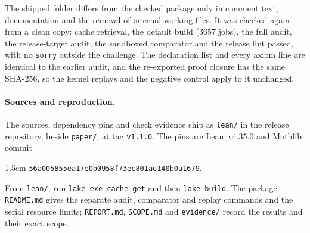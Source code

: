 The shipped folder differs from the checked package only in comment
text, documentation and the removal of internal working files. It was
checked again from a clean copy: cache retrieval, the default build
(\(3657\) jobs), the full audit, the release-target audit, the sandboxed
comparator and the release lint passed, with no \texttt{sorry} outside
the challenge. The declaration list and every axiom line are identical
to the earlier audit, and the re-exported proof closure has the same
SHA-256, so the kernel replays and the negative control apply to it
unchanged.

\paragraph{Sources and reproduction.}
The sources, dependency pins and check evidence ship as \texttt{lean/}
in the release repository, beside \texttt{paper/}, at tag
\texttt{v1.1.0}. The pins are Lean~v4.35.0 and Mathlib commit
\begin{flushleft}\small\leftskip1.5em
\nolinkurl{56a005855ea17e0b0958f73ec801ae140b0a1679}.
\end{flushleft}
From \texttt{lean/}, run \texttt{lake exe cache get} and then
\texttt{lake build}. The package \texttt{README.md} gives the separate
audit, comparator and replay commands and the serial resource limits;
\texttt{REPORT.md}, \texttt{SCOPE.md} and \texttt{evidence/} record the
results and their exact scope.
